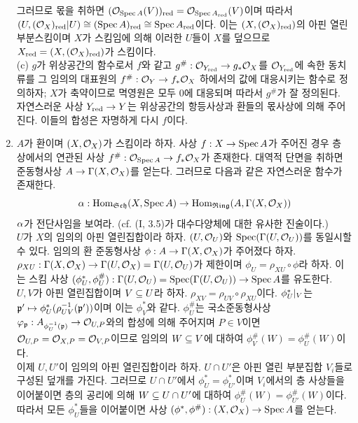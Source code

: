 \begin{enumerate}[label=\tb{2.\arabic*.},itemindent=0mm,itemsep=4mm]
	그러므로 몫을 취하면 $(\mathcal{O}_{\operatorname{Spec} A}(V))_{\mathrm{red}}=\mathcal{O}_{\operatorname{Spec} A_{\mathrm{red}}}(V)$이며
	따라서 $(U,(\mathcal{O}_X)_{\mathrm{red}}| U)\cong(\operatorname{Spec} A)_{\mathrm{red}}\cong\operatorname{Spec} A_{\mathrm{red}}$이다.
	이는 $(X,(\mathcal{O}_X)_{\mathrm{red}})$의 아핀 열린 부분스킴이며 $X$가 스킴임에 의해 이러한 $U$들이 $X$를 덮으므로
	$X_{\mathrm{red}}=(X,(\mathcal{O}_X)_{\mathrm{red}})$가 스킴이다.\\
	(c) $g$가 위상공간의 함수로서 $f$와 같고 $g^\#:\mathcal{O}_{Y_{\mathrm{red}}}\rightarrow g_*\mathcal{O}_X$를
	$\mathcal{O}_{Y_{\mathrm{red}}}$에 속한 동치류를 그 임의의 대표원의 $f^\#:\mathcal{O}_Y\rightarrow f_*\mathcal{O}_X$ 하에서의 값에 대응시키는 함수로 정의하자;
	$X$가 축약이므로 멱영원은 모두 0에 대응되며 따라서 $g^\#$가 잘 정의된다.\\
	자연스러운 사상 $Y_{\mathrm{red}}\rightarrow Y$는 위상공간의 항등사상과 환들의 몫사상에 의해 주어진다.
	이들의 합성은 자명하게 다시 $f$이다.
	\item $A$가 환이며 $(X,\mathcal{O}_X)$가 스킴이라 하자. 사상 $f:X\rightarrow\operatorname{Spec} A$가 주어진 경우
	층 상에서의 연관된 사상 $f^\#:\mathcal{O}_{\operatorname{Spec} A}\rightarrow f_*\mathcal{O}_X$가 존재한다.
	대역적 단면을 취하면 준동형사상 $A\rightarrow\Gamma(X,\mathcal{O}_X)$를 얻는다. 그러므로 다음과 같은 자연스러운 함수가 존재한다.
	$$\alpha:\operatorname{Hom}_{\mathfrak{Sch}}(X,\operatorname{Spec} A)\rightarrow\operatorname{Hom}_{\mathfrak{Ring}}(A,\Gamma(X,\mathcal{O}_X))$$
	$\alpha$가 전단사임을 보여라. (cf. (I, 3.5)가 대수다양체에 대한 유사한 진술이다.)\\
	\sol $U$가 $X$의 임의의 아핀 열린집합이라 하자. $(U,\mathcal{O}_U)$와 $\operatorname{Spec}(\Gamma(U,\mathcal{O}_U))$를 동일시할 수 있다.
	임의의 환 준동형사상 $\phi:A\rightarrow\Gamma(X,\mathcal{O}_X)$가 주어졌다 하자.
	$\rho_{XU}:\Gamma(X,\mathcal{O}_X)\rightarrow\Gamma(U,\mathcal{O}_X)=\Gamma(U,\mathcal{O}_U)$가 제한이며 $\phi_U=\rho_{XU}\circ\phi$라 하자.
	이는 스킴 사상 $(\phi_U^*,\phi_U^\#):\Gamma(U,\mathcal{O}_U)=\operatorname{Spec}(\Gamma(U,\mathcal{O}_U))\rightarrow\operatorname{Spec} A$를 유도한다.\\
	$U,V$가 아핀 열린집합이며 $V\subseteq U$라 하자. $\rho_{XV}=\rho_{UV}\circ\rho_{XU}$이다.
	$\phi_U^*|_V$는 $\mathfrak{p}'\mapsto\phi_U^*(\rho_{UV}^{-1}(\mathfrak{p}'))$이며 이는 $\phi_V^*$와 같다.
	$\phi_U^\#$는 국소준동형사상 $\varphi_{\mathfrak{p}}:A_{\phi_U^{-1}(\mathfrak{p})}\rightarrow\mathcal{O}_{U,P}$와의 합성에 의해 주어지며
	$P\in V$이면 $\mathcal{O}_{U,P}=\mathcal{O}_{X,P}=\mathcal{O}_{V,P}$이므로 임의의 $W\subseteq V$에 대하여 $\phi_V^\#(W)=\phi_U^\#(W)$이다.\\
	이제 $U,U'$이 임의의 아핀 열린집합이라 하자. $U\cap U'$은 아핀 열린 부분집합 $V_i$들로 구성된 덮개를 가진다.
	그러므로 $U\cap U'$에서 $\phi_U^*=\phi_{U'}^*$이며 $V_i$에서의 층 사상들을 이어붙이면
	층의 공리에 의해 $W\subseteq U\cap U'$에 대하여 $\phi_U^\#(W)=\phi_{U'}^\#(W)$이다.
	따라서 모든 $\phi_U^*$들을 이어붙이면 사상 $(\phi^*,\phi^\#):(X,\mathcal{O}_X)\rightarrow\operatorname{Spec} A$를 얻는다.

\end{enumerate}

